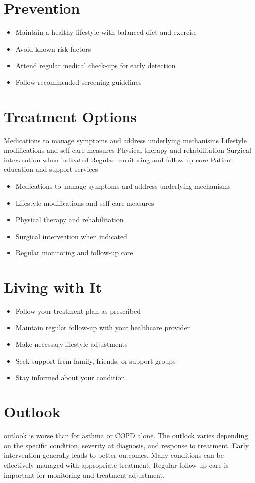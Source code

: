 \section{Prevention}
\begin{itemize}[noitemsep]
  \item Maintain a healthy lifestyle with balanced diet and exercise
  \item Avoid known risk factors
  \item Attend regular medical check-ups for early detection
  \item Follow recommended screening guidelines
\end{itemize}
\section{Treatment Options}
Medications to manage symptoms and address underlying mechanisms Lifestyle modifications and self-care measures Physical therapy and rehabilitation Surgical intervention when indicated Regular monitoring and follow-up care Patient education and support services

\begin{itemize}[noitemsep]
  \item Medications to manage symptoms and address underlying mechanisms
  \item Lifestyle modifications and self-care measures
  \item Physical therapy and rehabilitation
  \item Surgical intervention when indicated
  \item Regular monitoring and follow-up care
\end{itemize}
\section{Living with It}
\begin{itemize}[noitemsep]
  \item Follow your treatment plan as prescribed
  \item Maintain regular follow-up with your healthcare provider
  \item Make necessary lifestyle adjustments
  \item Seek support from family, friends, or support groups
  \item Stay informed about your condition
\end{itemize}
\section{Outlook}
outlook is worse than for asthma or COPD alone. The outlook varies depending on the specific condition, severity at diagnosis, and response to treatment. Early intervention generally leads to better outcomes. Many conditions can be effectively managed with appropriate treatment. Regular follow-up care is important for monitoring and treatment adjustment.

